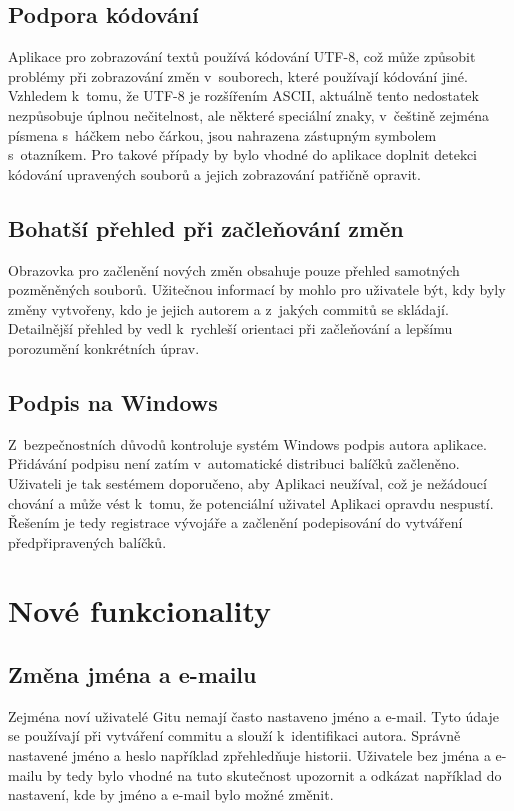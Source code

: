 \subsection{Podpora kódování}

Aplikace pro zobrazování textů používá kódování UTF-8, což může způsobit problémy při zobrazování změn v~souborech, které používají kódování jiné. Vzhledem k~tomu, že UTF-8 je rozšířením ASCII, aktuálně tento nedostatek nezpůsobuje úplnou nečitelnost, ale některé speciální znaky, v~češtině zejména písmena s~háčkem nebo čárkou, jsou nahrazena zástupným symbolem s~otazníkem. Pro takové případy by bylo vhodné do aplikace doplnit detekci kódování upravených souborů a jejich zobrazování patřičně opravit.

\subsection{Bohatší přehled při začleňování změn}

Obrazovka pro začlenění nových změn obsahuje pouze přehled samotných pozměněných souborů. Užitečnou informací by mohlo pro uživatele být, kdy byly změny vytvořeny, kdo je jejich autorem a z~jakých commitů se skládají. Detailnější přehled by vedl k~rychleší orientaci při začleňování a lepšímu porozumění konkrétních úprav.

\subsection{Podpis na Windows}

Z~bezpečnostních důvodů kontroluje systém Windows podpis autora aplikace. Přidávání podpisu není zatím v~automatické distribuci balíčků začleněno. Uživateli je tak sestémem doporučeno, aby Aplikaci neužíval, což je nežádoucí chování a může vést k~tomu, že potenciální uživatel Aplikaci opravdu nespustí. Řešením je tedy registrace vývojáře a začlenění podepisování do vytváření předpřipravených balíčků.


\section{Nové funkcionality}

\subsection{Změna jména a e-mailu}

Zejména noví uživatelé Gitu nemají často nastaveno jméno a e-mail. Tyto údaje se používají při vytváření commitu a slouží k~identifikaci autora. Správně nastavené jméno a heslo například zpřehledňuje historii. Uživatele bez jména a e-mailu by tedy bylo vhodné na tuto skutečnost upozornit a odkázat například do nastavení, kde by jméno a e-mail bylo možné změnit.

